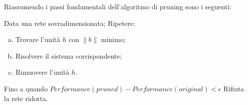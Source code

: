 Riassumendo i passi fondamentali dell'algoritmo di pruning sono i seguenti:
\begin{algorithmic}[1]%
	\State Data una rete sovradimensionata;
	\State Ripetere:
	\begin{enumerate}[(a)]
		\item Trovare l'unità $h$ con $\| b \|$ minimo;
		\item Risolvere il sistema corrispondente;
		\item Rimuovere l'unità $h$.
	\end{enumerate}
	Fino a quando $Performance(pruned) - Performance(original) < \epsilon$
	\State Rifiuta la rete ridotta.
\end{algorithmic}




















